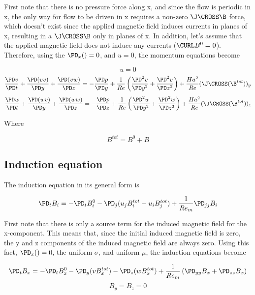 First note that there is no pressure force along x, and since the flow is periodic in x, the only way for flow to be driven in x requires a non-zero $\J \CROSS \B$ force, which doesn't exist since the applied magnetic field induces currents in planes of x, resulting in a $\J \CROSS \B$ only in planes of x. In addition, let's assume that the applied magnetic field does not induce any currents ($\CURL B^0=0$). Therefore, using the $\PD_x () = 0$, and $u = 0$, the momentum equations become

\begin{equation}
	u=0
\end{equation}
\begin{equation}
	\frac{\PD v}{\PD t}
	+ \frac{\PD (v v)}{\PD y}
	+ \frac{\PD (v w)}{\PD z}
	=
	- \frac{\PD p}{\PD y}
	+ \frac{1}{Re}
	\left(
	\frac{\PD^2 v}{\PD y^2}
	+\frac{\PD^2 v}{\PD z^2}
	\right)
	+ \frac{Ha^2}{Re}
	(\J \CROSS (\B^{tot}))_y
\end{equation}
\begin{equation}
	\frac{\PD w}{\PD t}
	+ \frac{\PD (w v)}{\PD y}
	+ \frac{\PD (w w)}{\PD z}
	=
	- \frac{\PD p}{\PD z}
	+ \frac{1}{Re}
	\left(
	\frac{\PD^2 w}{\PD y^2}
	+\frac{\PD^2 w}{\PD z^2}
	\right)
	+ \frac{Ha^2}{Re}
	(\J \CROSS (\B^{tot}))_z
\end{equation}

Where

\begin{equation}
	B^{tot} = B^0 + B
\end{equation}

\subsection{Induction equation}

The induction equation in its general form is

\begin{equation}
	\PD_t B_i
	=
	- \PD_t B_i^0
	- \PD_j (u_j B_i^{tot} - u_i B_j^{tot})
	+
	\frac{1}{Re_m}
	\PD_{jj} B_i
\end{equation}

First note that there is only a source term for the induced magnetic field for the x-component. This means that, since the initial induced magnetic field is zero, the y and z components of the induced magnetic field are always zero. Using this fact, $\PD_x ()=0$, the uniform $\sigma$, and uniform $\mu$, the induction equations become


\begin{equation}
	\PD_t B_x
	=
	- \PD_t B_x^0
	- \PD_y (v B_x^{tot})
	- \PD_z (w B_x^{tot})
	+ \frac{1}{Re_m}
	\left(
	\PD_{yy} B_x
	+
	\PD_{zz} B_x
	\right)
\end{equation}
\begin{equation}
	B_y = B_z = 0
\end{equation}

